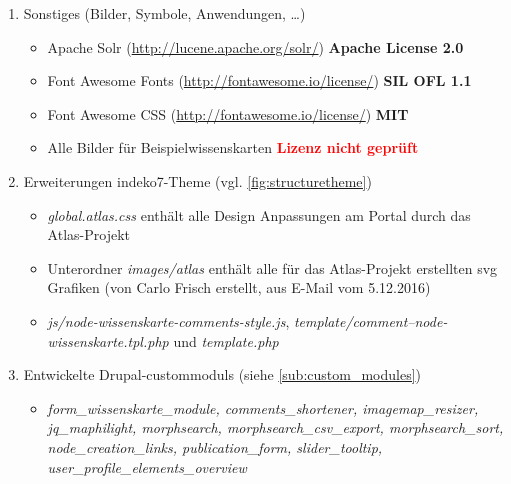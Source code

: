 \begin{enumerate}[parsep=0pt, itemsep=5.0pt plus 2.0pt minus 1.0pt, leftmargin=*]
	\item Sonstiges (Bilder, Symbole, Anwendungen, \dots\label{sub:license_images})
	\begin{itemize}
		\item Apache Solr (\url{http://lucene.apache.org/solr/}) \textbf{Apache License 2.0}
		\item Font Awesome Fonts (\url{http://fontawesome.io/license/}) \textbf{SIL OFL 1.1}
		\item Font Awesome CSS (\url{http://fontawesome.io/license/}) \textbf{MIT}
		\item Alle Bilder für Beispielwissenskarten \textcolor{red}{\textbf{Lizenz nicht geprüft}}
	\end{itemize}

	\item Erweiterungen indeko7-Theme (vgl. \cref{fig:structuretheme})
	\begin{itemize}
		\item \textit{global.atlas.css} enthält alle Design Anpassungen am Portal durch das Atlas-Projekt
		\item Unterordner \textit{images/atlas} enthält alle für das Atlas-Projekt erstellten svg Grafiken (von Carlo Frisch erstellt, aus E-Mail vom 5.12.2016)
		\item \textit{js/node-wissenskarte-comments-style.js}, \textit{template/comment--node-wissenskarte.tpl.php} und \textit{template.php}
	\end{itemize}

	\item Entwickelte Drupal-\glspl{custommodul} (siehe \cref{sub:custom_modules})
	\begin{itemize}
		\item \textit{form\_wissenskarte\_module, comments\_shortener, imagemap\_resizer, jq\_maphilight, morphsearch, morphsearch\_csv\_export, morphsearch\_sort, node\_creation\_links, publication\_form, slider\_tooltip, user\_profile\_elements\_overview}
	\end{itemize}
\end{enumerate}


\newpage
